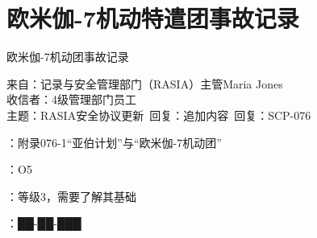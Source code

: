 \chapter{欧米伽-7机动特遣团事故记录}

\label{chap:DOC-scp-076-2}

欧米伽-7机动团事故记录

\begin{scpbox}

来自：记录与安全管理部门（RASIA）主管Maria Jones\\
收信者：4级管理部门员工\\
主题：RASIA安全协议更新\ 回复：追加内容\ 回复：SCP-076

：附录076-1“亚伯计划”与“欧米伽-7机动团”

：O5

：等级3，需要了解其基础

：██-██-███

\end{scpbox}

\hr


